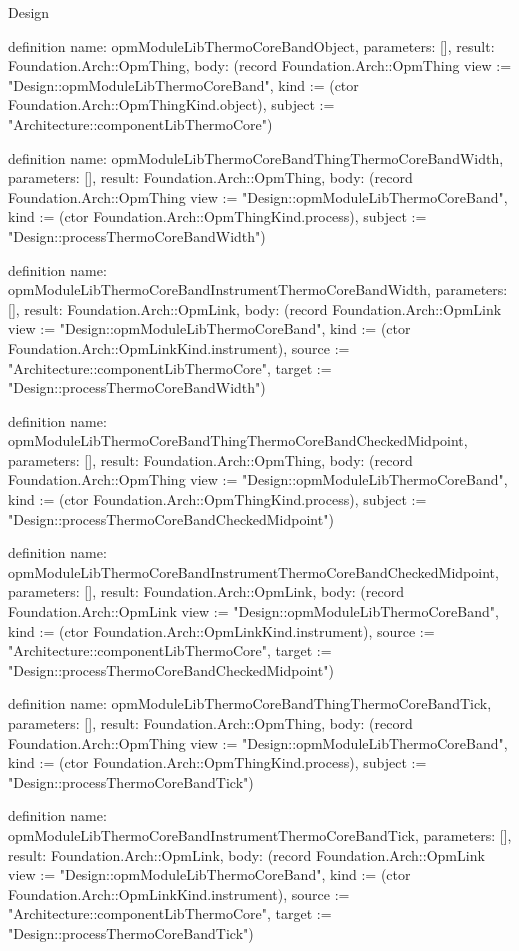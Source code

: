 \begin{lexlean}{Design}
\begin{semanticmodule}
definition{
  name: opmModuleLibThermoCoreBandObject,
  parameters: [],
  result: Foundation.Arch::OpmThing,
  body: (record Foundation.Arch::OpmThing {view := "Design::opmModuleLibThermoCoreBand", kind := (ctor Foundation.Arch::OpmThingKind.object), subject := "Architecture::componentLibThermoCore"})
}

definition{
  name: opmModuleLibThermoCoreBandThingThermoCoreBandWidth,
  parameters: [],
  result: Foundation.Arch::OpmThing,
  body: (record Foundation.Arch::OpmThing {view := "Design::opmModuleLibThermoCoreBand", kind := (ctor Foundation.Arch::OpmThingKind.process), subject := "Design::processThermoCoreBandWidth"})
}

definition{
  name: opmModuleLibThermoCoreBandInstrumentThermoCoreBandWidth,
  parameters: [],
  result: Foundation.Arch::OpmLink,
  body: (record Foundation.Arch::OpmLink {view := "Design::opmModuleLibThermoCoreBand", kind := (ctor Foundation.Arch::OpmLinkKind.instrument), source := "Architecture::componentLibThermoCore", target := "Design::processThermoCoreBandWidth"})
}

definition{
  name: opmModuleLibThermoCoreBandThingThermoCoreBandCheckedMidpoint,
  parameters: [],
  result: Foundation.Arch::OpmThing,
  body: (record Foundation.Arch::OpmThing {view := "Design::opmModuleLibThermoCoreBand", kind := (ctor Foundation.Arch::OpmThingKind.process), subject := "Design::processThermoCoreBandCheckedMidpoint"})
}

definition{
  name: opmModuleLibThermoCoreBandInstrumentThermoCoreBandCheckedMidpoint,
  parameters: [],
  result: Foundation.Arch::OpmLink,
  body: (record Foundation.Arch::OpmLink {view := "Design::opmModuleLibThermoCoreBand", kind := (ctor Foundation.Arch::OpmLinkKind.instrument), source := "Architecture::componentLibThermoCore", target := "Design::processThermoCoreBandCheckedMidpoint"})
}

definition{
  name: opmModuleLibThermoCoreBandThingThermoCoreBandTick,
  parameters: [],
  result: Foundation.Arch::OpmThing,
  body: (record Foundation.Arch::OpmThing {view := "Design::opmModuleLibThermoCoreBand", kind := (ctor Foundation.Arch::OpmThingKind.process), subject := "Design::processThermoCoreBandTick"})
}

definition{
  name: opmModuleLibThermoCoreBandInstrumentThermoCoreBandTick,
  parameters: [],
  result: Foundation.Arch::OpmLink,
  body: (record Foundation.Arch::OpmLink {view := "Design::opmModuleLibThermoCoreBand", kind := (ctor Foundation.Arch::OpmLinkKind.instrument), source := "Architecture::componentLibThermoCore", target := "Design::processThermoCoreBandTick"})
}


\end{semanticmodule}
\end{lexlean}
